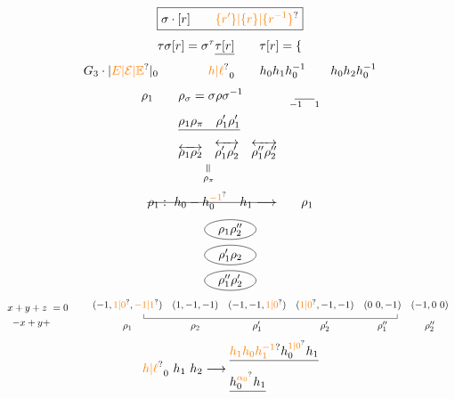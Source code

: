 \[
\boxed{\sigma\cdot[r]\qquad\unsure{\{r'\}|\{r\}|\{r^{-1}\}}}
\]
\[
\tau\sigma[r]=\sigma^\tau\underline{\tau[r]}
\qquad \tau[r]=\left\{\vphantom{\Large A}\right.
\]
\[
G_3\cdot|\unsure{E|\mathcal E|\mathbb E}|_0\qquad\qquad
\unsure{h|\ell}_0\qquad h_0h_1h_0^{-1}\qquad h_0h_2h_0^{-1}
\]
\[
\begin{aligned}
\rho_1\qquad &\rho_\sigma=\sigma\rho\sigma^{-1}
  &&\underset{-1\quad1}{\rule{1.6em}{.4pt}}\\
&\deleted{\rho_1\rho_\pi\quad\rho'_1\rho'_1}\\
&\overleftrightarrow{\rho_1\rho_2}\quad
  \overleftrightarrow{\rho'_1\rho'_2}\quad\overleftrightarrow{\rho''_1\rho''_2}
  &&\\[-1pt]
&\qquad\underset{\rho_\pi}{\rotatebox{90}{$=$}}
\end{aligned}
\]
\[
\deleted{\rho_1:\ h_0\mathbin{-}h_0^{\unsure{-1}}\quad h_1\longrightarrow}\qquad\rho_1
\]
\[
\begin{aligned}
&\tikz[baseline=(a.base)]{\node (a) {$\rho_1\rho''_2$}; \draw (a.center) ellipse (2.1em and .8em);}\\
&\tikz[baseline=(b.base)]{\node (b) {$\rho'_1\rho_2$}; \draw (b.center) ellipse (2.1em and .8em);}\\
&\tikz[baseline=(c.base)]{\node (c) {$\rho''_1\rho'_2$}; \draw (c.center) ellipse (2.1em and .8em);}
\end{aligned}
\]
\[
\begin{aligned}
x+y+z\ &=0\\
-x+y+&
\end{aligned}
\qquad
\begin{array}{cccccc}
(-1,\unsure{1|0},\unsure{-1|1})&(1,-1,-1)&(-1,-1,\unsure{1|0})&
(\unsure{1|0},-1,-1)&(0\ 0,-1)&(-1,0\ 0)\\[-1pt]
\multicolumn{6}{c}{\rule{.4pt}{.45em}\rule{.75\linewidth}{.4pt}\rule{.4pt}{.45em}}\\[-2pt]
\rho_1&\rho_2&\rho'_1&\rho'_2&\rho''_1&\rho''_2
\end{array}
\]
\[
\unsure{h|\ell}_0\ h_1\ h_2\longrightarrow
\begin{aligned}
&\deleted{\unsure{h_1h_0h_1^{-1}}h_0^{\unsure{1|0}}h_1}\\
&\deleted{h_0^{\unsure{\alpha_0}}h_1}
\end{aligned}
\]
